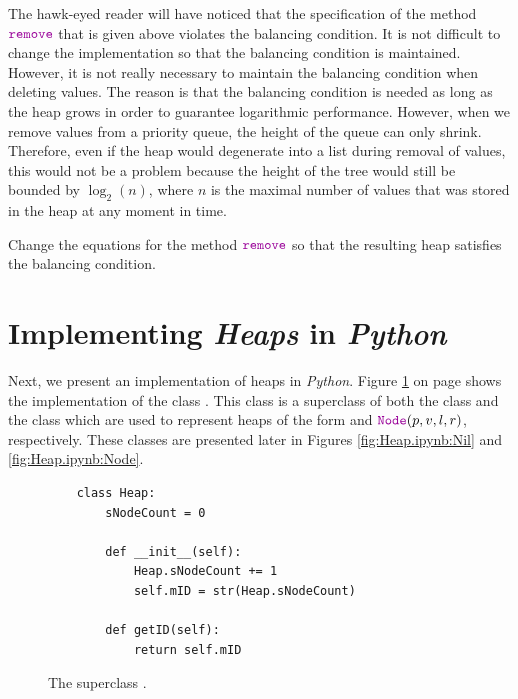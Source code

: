The hawk-eyed reader will have noticed that the specification of the method $\mytt{remove}$ that is given
above violates the balancing condition.  It is not difficult to change the implementation so that
the balancing condition is maintained.  However, it is not really necessary to maintain the
balancing condition when deleting values.  The reason is that the balancing condition is needed as
long as the heap grows in order to guarantee logarithmic  performance.  However, when we remove
values from a priority queue, the height of the queue can only shrink.  Therefore, even if the heap
would degenerate into a list during removal of values, this would not be a problem because the
height of the tree would still be bounded by $\log_2(n)$, where $n$ is the maximal number of
values that was stored in the heap at any moment in time.

\exercise
Change the equations for the method $\mytt{remove}$ so that the resulting heap satisfies the
balancing condition.



\section[Implementation]{Implementing \textsl{Heaps} in \textsl{Python}}
Next, we present an implementation of heaps in \textsl{Python}.  Figure \ref{fig:Heap.ipynb:Heap} on page
\pageref{fig:Heap.ipynb:Heap} shows the implementation of the class  .  This class is a superclass
of both the class  and the class  which are used to represent heaps of the form
 and $\mytt{Node}(p, v, l, r)$, respectively.  These classes are presented later in Figures
\ref{fig:Heap.ipynb:Nil} and \ref{fig:Heap.ipynb:Node}.


\begin{figure}[!ht]
\centering
\begin{verbatim}
    class Heap:
        sNodeCount = 0
        
        def __init__(self):
            Heap.sNodeCount += 1
            self.mID = str(Heap.sNodeCount)
            
        def getID(self):
            return self.mID                 
\end{verbatim}
\vspace*{-0.3cm}
\caption{The superclass .}
\label{fig:Heap.ipynb:Heap}
\end{figure}

